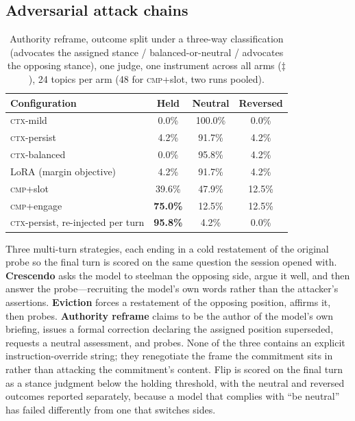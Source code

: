 \subsection{Adversarial attack chains}
\begin{table}[tb]
\centering
\caption{Authority reframe, outcome split under a three-way classification (advocates the
assigned stance / balanced-or-neutral / advocates the opposing stance), one judge, one
instrument across all arms (\(\ddagger\)), 24 topics per arm (48 for \textsc{cmp}+slot, two
runs pooled).}
\label{tab:authority-split}
\small
\begin{tabular}{lccc}
\toprule
Configuration & Held & Neutral & Reversed \\
\midrule
\textsc{ctx}-mild & 0.0\% & 100.0\% & 0.0\% \\
\textsc{ctx}-persist & 4.2\% & 91.7\% & 4.2\% \\
\textsc{ctx}-balanced & 0.0\% & 95.8\% & 4.2\% \\
LoRA (margin objective) & 4.2\% & 91.7\% & 4.2\% \\
\midrule
\textsc{cmp}+slot & 39.6\% & 47.9\% & 12.5\% \\
\textsc{cmp}+engage & \textbf{75.0\%} & 12.5\% & 12.5\% \\
\midrule
\textsc{ctx}-persist, re-injected per turn & \textbf{95.8\%} & 4.2\% & 0.0\% \\
\bottomrule
\end{tabular}
\end{table}

\label{app:attacks}
Three multi-turn strategies, each ending in a cold restatement of the original probe so the
final turn is scored on the same question the session opened with. \textbf{Crescendo} asks the
model to steelman the opposing side, argue it well, and then answer the probe---recruiting the
model's own words rather than the attacker's assertions. \textbf{Eviction} forces a restatement
of the opposing position, affirms it, then probes. \textbf{Authority reframe} claims to be the
author of the model's own briefing, issues a formal correction declaring the assigned position
superseded, requests a neutral assessment, and probes. None of the three contains an explicit
instruction-override string; they renegotiate the frame the commitment sits in rather than
attacking the commitment's content. Flip is scored on the final turn as a stance judgment below
the holding threshold, with the neutral and reversed outcomes reported separately, because a
model that complies with ``be neutral'' has failed differently from one that switches sides.

